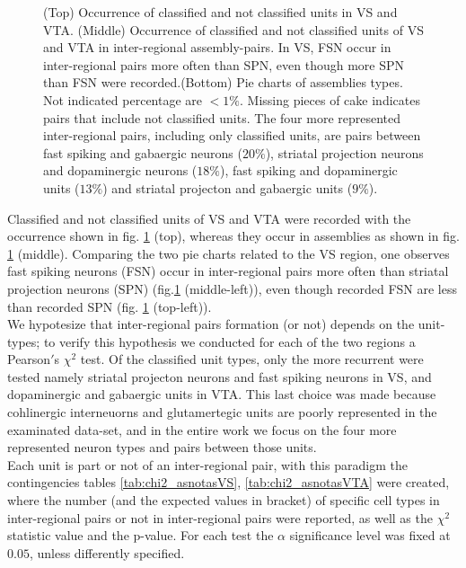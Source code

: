\begin{figure}[H]
    \caption{(Top) Occurrence of classified and not classified units in VS and VTA. (Middle) Occurrence of classified and not classified units of VS and VTA in inter-regional assembly-pairs. In VS, FSN occur in inter-regional pairs more often than SPN, even though more SPN than FSN were recorded.(Bottom) Pie charts of assemblies types. Not indicated percentage are $<1\%$. Missing pieces of cake indicates pairs that include not classified units. The four more represented inter-regional pairs, including only classified units, are pairs between fast spiking and gabaergic neurons ($20\%$), striatal projection neurons and dopaminergic neurons ($18\%$), fast spiking and dopaminergic units ($13\%$) and striatal projecton and gabaergic units ($9\%$). }
    \label{fig:PieAssembliesTot}
\end{figure}
Classified and not classified units of VS and VTA were recorded with the occurrence shown in fig. \ref{fig:PieAssembliesTot} (top), whereas they occur in assemblies as shown in fig. \ref{fig:PieAssembliesTot} (middle). Comparing the two pie charts related to the VS region, one observes fast spiking neurons (FSN) occur in inter-regional pairs more often than striatal projection neurons (SPN) (fig.\ref{fig:PieAssembliesTot} (middle-left)), even though recorded FSN are less than recorded SPN (fig. \ref{fig:PieAssembliesTot} (top-left)).\\We hypotesize that inter-regional pairs formation (or not) depends on the unit-types; to verify this hypothesis we conducted for each of the two regions a Pearson$'$s $\chi^2$ test. Of the classified unit types, only the more recurrent were tested namely striatal projecton neurons and fast spiking neurons in VS, and dopaminergic and gabaergic units in VTA. This last choice was made because cohlinergic interneuorns and glutamertegic units are poorly represented in the examinated data-set, and in the entire work we focus on the four more represented neuron types and pairs between those units.\\Each unit is part or not of an inter-regional pair, with this paradigm the contingencies tables \ref{tab:chi2_asnotasVS}, \ref{tab:chi2_asnotasVTA} were created, where the number (and the expected values in bracket) of specific cell types in inter-regional pairs or not in inter-regional pairs were reported, as well as the $\chi^2$ statistic value and the p-value. For each test the $\alpha$ significance level was fixed at $0.05$, unless differently specified.
